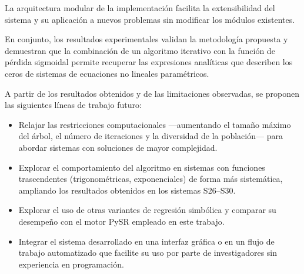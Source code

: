 La arquitectura modular de la implementación facilita la extensibilidad del sistema y su aplicación a nuevos problemas sin modificar los módulos existentes.

En conjunto, los resultados experimentales validan la metodología propuesta y demuestran que la combinación de un algoritmo iterativo con la función de pérdida sigmoidal permite recuperar las expresiones analíticas que describen los ceros de sistemas de ecuaciones no lineales paramétricos.

\begin{recomendations}
\label{sec:recomendaciones}

A partir de los resultados obtenidos y de las limitaciones observadas, se proponen las siguientes líneas de trabajo futuro:

\begin{itemize}
    \item Relajar las restricciones computacionales —aumentando el tamaño máximo del árbol, el número de iteraciones y la diversidad de la población— para abordar sistemas con soluciones de mayor complejidad.

    \item Explorar el comportamiento del algoritmo en sistemas con funciones trascendentes (trigonométricas, exponenciales) de forma más sistemática, ampliando los resultados obtenidos en los sistemas S26--S30.

    \item Explorar el uso de otras variantes de regresión simbólica y comparar su desempeño con el motor PySR empleado en este trabajo.

    \item Integrar el sistema desarrollado en una interfaz gráfica o en un flujo de trabajo automatizado que facilite su uso por parte de investigadores sin experiencia en programación.
\end{itemize}
\end{recomendations}
